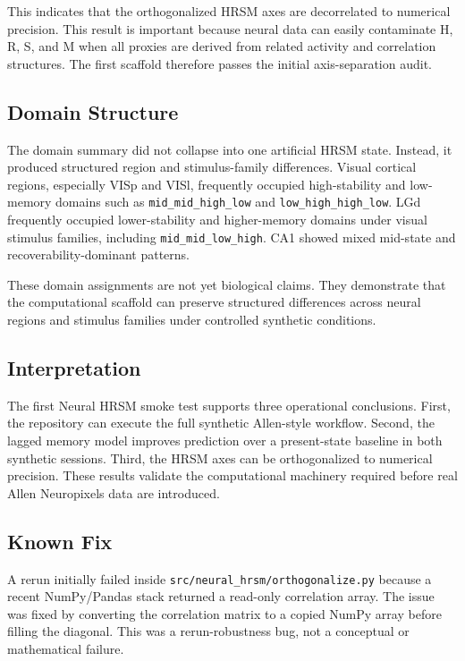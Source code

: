 This indicates that the orthogonalized HRSM axes are decorrelated to numerical precision. This result is important because neural data can easily contaminate H, R, S, and M when all proxies are derived from related activity and correlation structures. The first scaffold therefore passes the initial axis-separation audit.

\subsection{Domain Structure}

The domain summary did not collapse into one artificial HRSM state. Instead, it produced structured region and stimulus-family differences. Visual cortical regions, especially VISp and VISl, frequently occupied high-stability and low-memory domains such as \texttt{mid\_mid\_high\_low} and \texttt{low\_high\_high\_low}. LGd frequently occupied lower-stability and higher-memory domains under visual stimulus families, including \texttt{mid\_mid\_low\_high}. CA1 showed mixed mid-state and recoverability-dominant patterns.

These domain assignments are not yet biological claims. They demonstrate that the computational scaffold can preserve structured differences across neural regions and stimulus families under controlled synthetic conditions.

\subsection{Interpretation}

The first Neural HRSM smoke test supports three operational conclusions. First, the repository can execute the full synthetic Allen-style workflow. Second, the lagged memory model improves prediction over a present-state baseline in both synthetic sessions. Third, the HRSM axes can be orthogonalized to numerical precision. These results validate the computational machinery required before real Allen Neuropixels data are introduced.

\subsection{Known Fix}

A rerun initially failed inside \texttt{src/neural\_hrsm/orthogonalize.py} because a recent NumPy/Pandas stack returned a read-only correlation array. The issue was fixed by converting the correlation matrix to a copied NumPy array before filling the diagonal. This was a rerun-robustness bug, not a conceptual or mathematical failure.

